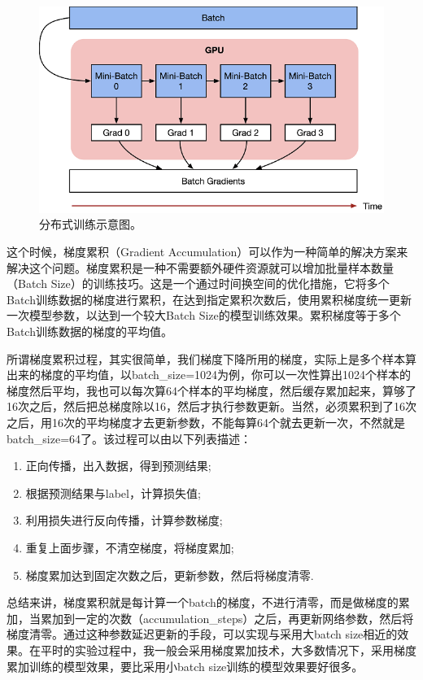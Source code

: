 \documentclass[a4paper]{zreport}
\begin{document}
\begin{figure}[h]
\centering
\includegraphics[width=0.9\linewidth]{figures/grad}
\caption{分布式训练示意图。}
\label{fig:grad}
\end{figure}


这个时候，梯度累积（Gradient Accumulation）可以作为一种简单的解决方案来解决这个问题。梯度累积是一种不需要额外硬件资源就可以增加批量样本数量（Batch Size）的训练技巧。这是一个通过时间换空间的优化措施，它将多个Batch训练数据的梯度进行累积，在达到指定累积次数后，使用累积梯度统一更新一次模型参数，以达到一个较大Batch Size的模型训练效果。累积梯度等于多个Batch训练数据的梯度的平均值。

所谓梯度累积过程，其实很简单，我们梯度下降所用的梯度，实际上是多个样本算出来的梯度的平均值，以batch\_size=1024为例，你可以一次性算出1024个样本的梯度然后平均，我也可以每次算64个样本的平均梯度，然后缓存累加起来，算够了16次之后，然后把总梯度除以16，然后才执行参数更新。当然，必须累积到了16次之后，用16次的平均梯度才去更新参数，不能每算64个就去更新一次，不然就是batch\_size=64了。该过程可以由以下列表描述：

\begin{enumerate}
\item 正向传播，出入数据，得到预测结果;
\item 根据预测结果与label，计算损失值;
\item 利用损失进行反向传播，计算参数梯度;
\item 重复上面步骤，不清空梯度，将梯度累加;
\item 梯度累加达到固定次数之后，更新参数，然后将梯度清零.
\end{enumerate}

总结来讲，梯度累积就是每计算一个batch的梯度，不进行清零，而是做梯度的累加，当累加到一定的次数（accumulation\_steps）之后，再更新网络参数，然后将梯度清零。通过这种参数延迟更新的手段，可以实现与采用大batch size相近的效果。在平时的实验过程中，我一般会采用梯度累加技术，大多数情况下，采用梯度累加训练的模型效果，要比采用小batch size训练的模型效果要好很多。
\end{document}
